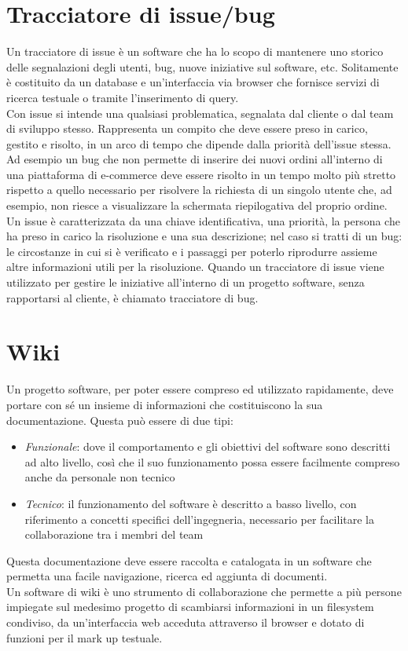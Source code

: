 \documentclass[a4paper, 12pt]{report}
\numberwithin{equation}{section}
\begin{document}
\section{Tracciatore di issue/bug}
Un tracciatore di issue è un software che ha lo scopo di mantenere uno storico delle segnalazioni degli utenti, bug, nuove iniziative sul software, etc. 
Solitamente è costituito da un database e un’interfaccia via browser che fornisce servizi di ricerca testuale o tramite l’inserimento di query.\\
Con issue si intende una qualsiasi problematica, segnalata dal cliente o dal team di sviluppo stesso. Rappresenta un compito che deve essere preso in carico, gestito e risolto, in un arco di tempo che dipende dalla priorità dell’issue stessa. Ad esempio un bug che non permette di inserire dei nuovi ordini all’interno di una piattaforma di e-commerce deve essere risolto in un tempo molto più stretto rispetto a quello necessario per risolvere la richiesta di un singolo utente che, ad esempio, non riesce a visualizzare la schermata riepilogativa del proprio ordine.\\
Un issue è caratterizzata da una chiave identificativa, una priorità, la persona che ha preso in carico la risoluzione e una sua descrizione; nel caso si tratti di un bug: le circostanze in cui si è verificato e i passaggi per poterlo riprodurre assieme altre informazioni utili per la risoluzione.
Quando un tracciatore di issue viene utilizzato per gestire le iniziative all’interno di un progetto software, senza rapportarsi al cliente, è chiamato tracciatore di bug.

\section{Wiki}
Un progetto software, per poter essere compreso ed utilizzato rapidamente, deve portare con sé un insieme di informazioni che costituiscono la sua documentazione. Questa può essere di due tipi:
\begin{itemize}
    \item \emph{Funzionale}: dove il comportamento e gli obiettivi del software sono descritti ad alto livello, così che il suo funzionamento possa essere facilmente compreso anche da personale non tecnico
    \item \emph{Tecnico}: il funzionamento del software è descritto a basso livello, con riferimento a concetti specifici dell’ingegneria, necessario per facilitare la collaborazione tra i membri del team
\end{itemize}
Questa documentazione deve essere raccolta e catalogata in un software che permetta una facile navigazione, ricerca ed aggiunta di documenti.\\
Un software di wiki è uno strumento di collaborazione che permette a più persone impiegate sul medesimo progetto di scambiarsi informazioni in un filesystem condiviso, da un’interfaccia web acceduta attraverso il browser e dotato di funzioni per il mark up testuale.
\end{document}

